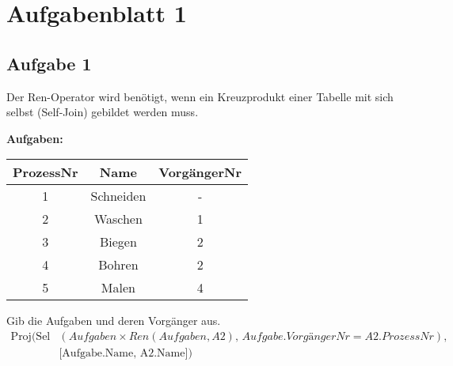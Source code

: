 
\section{Aufgabenblatt 1}
\subsection{Aufgabe 1}
Der Ren-Operator wird benötigt, wenn ein Kreuzprodukt einer Tabelle mit sich selbst (Self-Join) gebildet werden muss.

    \begin{table}[H]
        \centering
        \textbf{Aufgaben:} \\ [10pt]
        \begin{tabular}{|c|c|c|}
            \hline
            \textbf{ProzessNr} & \textbf{Name} & \textbf{VorgängerNr} \\
            \hline
            1 & Schneiden   & - \\
            2 & Waschen     & 1 \\
            3 & Biegen      & 2 \\
            4 & Bohren      & 2 \\
            5 & Malen       & 4\\
            \hline
        \end{tabular}
    \end{table}

    Gib die Aufgaben und deren Vorgänger aus.
    \begin{align*}
        \text{Proj}\bigl(
        \text{Sel}&(Aufgaben \times Ren(Aufgaben, A2),\, Aufgabe.VorgängerNr = A2.ProzessNr),\, \\
        &\text{[Aufgabe.Name, A2.Name]}
        \bigr)
    \end{align*}


